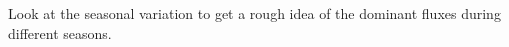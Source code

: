 \documentclass[twocolumn, 10pt, a4paper]{article}
\newenvironment{PC_prac_environment}{
\def\Q{\noindent \color{Gray}\rule[-0.1cm]{\columnwidth}{1.5pt}  \color{black} } \let\ques\Q 
\def\nQ{\noindent \color{black} } \let\ques\nQ 
\def\E{\color{Gray}\rule[0.3cm]{\columnwidth}{1.5pt} \color{black}} \let\ques\E }
\newcommand{\A}[2] { \ifthenelse{\boolean{showanswer}} {\noindent \color{cyan}{#2}\color{black}} {\multido{}{#1}{\noindent \color{light-gray}\hrulefill\\} } }
\begin{document}
\begin{PC_prac_environment}
\Q Look at the seasonal variation to get a rough idea of the dominant fluxes during different seasons.\\

\end{PC_prac_environment}
\end{document}
